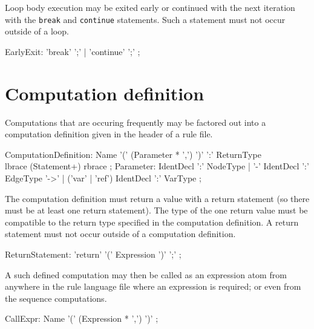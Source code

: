 Loop body execution may be exited early or continued with the next iteration with the \texttt{break} and \texttt{continue} statements. Such a statement must not occur outside of a loop.

\begin{rail} 
  EarlyExit: 
	'break' ';' |	'continue' ';'
	;
\end{rail}

\section{Computation definition} \label{sub:compdef}

Computations that are occuring frequently may be factored out into a computation definition given in the header of a rule file.
\begin{rail} 
  ComputationDefinition: 
	Name '(' (Parameter * ',') ')' ':' ReturnType \\
	lbrace (Statement+) rbrace
  ;
  Parameter: IdentDecl ':' NodeType |
  '-' IdentDecl ':' EdgeType '->' |
  ('var' | 'ref') IdentDecl ':' VarType
	;
\end{rail}

The computation definition must return a value with a return statement (so there must be at least one return statement).
The type of the one return value must be compatible to the return type specified in the computation definition.
A return statement must not occur outside of a computation definition.

\begin{rail}
  ReturnStatement: 'return' '(' Expression ')' ';' ;
\end{rail}

A such defined computation may then be called as an expression atom from anywhere in the rule language file where an expression is required; or even from the sequence computations.

\begin{rail}
  CallExpr: Name '(' (Expression * ',') ')' ;
\end{rail}
